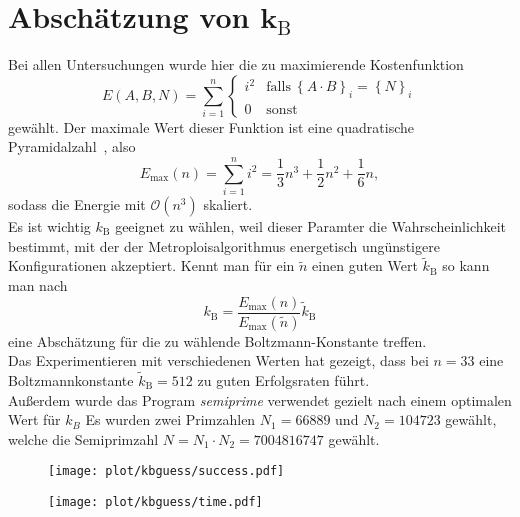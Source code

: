 \section{\texorpdfstring{Abschätzung von $\bm{k_\mathrm{B}}$}{Abschätzung von kB}}\label{sec:kbguess}
Bei allen Untersuchungen wurde hier die zu maximierende Kostenfunktion
\begin{equation*}
		E\left(A,B,N\right)=\sum\limits_{i=1}^n\begin{cases}
    i^2 & \mathrm{falls}\:{\left\{A\cdot B\right\}}_i={\left\{N\right\}}_i \\
	0 & \mathrm{sonst}
  \end{cases}
\end{equation*}
gewählt. Der maximale Wert dieser Funktion ist eine quadratische Pyramidalzahl~\parencite{oeis}, also
\begin{equation*}
		E_{\mathrm{max}}\left(n\right)=\sum\limits_{i=1}^n i^2=\frac{1}{3}n^3+\frac{1}{2}n^2+\frac{1}{6}n,
\end{equation*}
sodass die Energie mit $\mathcal{O}\left(n^3\right)$ skaliert. \\
Es ist wichtig $k_\mathrm{B}$ geeignet zu wählen, weil dieser Paramter die Wahrscheinlichkeit bestimmt, mit der der Metroploisalgorithmus energetisch ungünstigere Konfigurationen akzeptiert. Kennt man für ein $\tilde{n}$ einen guten Wert $\tilde{k}_\mathrm{B}$ so kann man nach
\begin{equation*}
		k_\mathrm{B}=\frac{E_{\mathrm{max}}\left(n\right)}{E_{\mathrm{max}}\left(\tilde{n}\right)}\tilde{k}_\mathrm{B}
\end{equation*}
eine Abschätzung für die zu wählende Boltzmann-Konstante treffen. \\
Das Experimentieren mit verschiedenen Werten hat gezeigt, dass bei $n=33$ eine Boltzmannkonstante $\tilde{k}_\mathrm{B}=512$ zu guten Erfolgsraten führt. \\
Außerdem wurde das Program \textit{semiprime} verwendet gezielt nach einem optimalen Wert für $k_B$
Es wurden zwei Primzahlen $N_1=66889$ und $N_2=104723$ gewählt, welche die Semiprimzahl $N=N_1\cdot N_2=7004816747$ gewählt.
\begin{figure}[ht]
		\centering
		\texttt{[image: plot/kbguess/success.pdf]}
\end{figure}
\begin{figure}[ht]
		\centering
		\texttt{[image: plot/kbguess/time.pdf]}
\end{figure}

